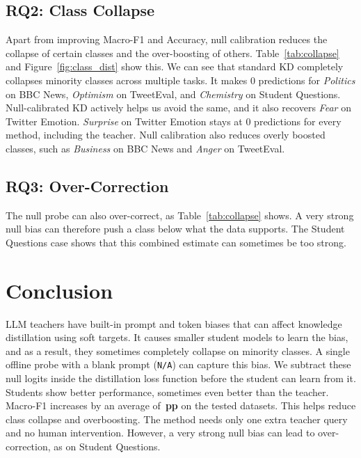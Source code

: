 \documentclass[11pt]{article}
\begin{document}
\subsection{RQ2: Class Collapse}



Apart from improving Macro-F1 and Accuracy, null calibration reduces the collapse of certain classes and the over-boosting of others.
Table~\ref{tab:collapse} and Figure~\ref{fig:class_dist} show this.
We can see that standard KD completely collapses minority classes across multiple tasks.
It makes 0 predictions for \textit{Politics} on BBC News, \textit{Optimism} on TweetEval, and \textit{Chemistry} on Student Questions.
Null-calibrated KD actively helps us avoid the same, and it also recovers \textit{Fear} on Twitter Emotion.
\textit{Surprise} on Twitter Emotion stays at 0 predictions for every method, including the teacher.
Null calibration also reduces overly boosted classes, such as \textit{Business} on BBC News and \textit{Anger} on TweetEval.

\subsection{RQ3: Over-Correction}
\label{sec:overcorrection}

The null probe can also over-correct, as Table~\ref{tab:collapse} shows.
\OverCorrectionText{}
A very strong null bias can therefore push a class below what the data supports.
The Student Questions case shows that this combined estimate can sometimes be too strong.


\section{Conclusion}

LLM teachers have built-in prompt and token biases that can affect knowledge distillation using soft targets.
It causes smaller student models to learn the bias, and as a result, they sometimes completely collapse on minority classes.
A single offline probe with a blank prompt (\texttt{N/A}) can capture this bias.
We subtract these null logits inside the distillation loss function before the student can learn from it.
Students show better performance, sometimes even better than the teacher.
Macro-F1 increases by an average of \textbf{\AvgGainStd{}\,pp} on the tested datasets.
This helps reduce class collapse and overboosting.
The method needs only one extra teacher query and no human intervention.
However, a very strong null bias can lead to over-correction, as on Student Questions.
\end{document}
